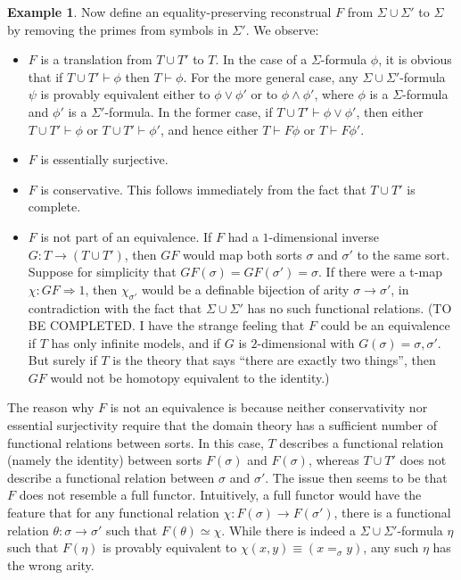 \documentclass[12pt]{article}
\theoremstyle{definition}
\newtheorem{example}[prop]{Example}
\theoremstyle{remark}
\newcommand{\3}{\mathcal}
\begin{document}
\begin{example}
  Now define an equality-preserving reconstrual $F$ from
  $\Sigma\cup \Sigma '$ to $\Sigma$ by removing the primes from
  symbols in $\Sigma '$. We observe:
  \begin{itemize}
  \item $F$ is a translation from $T\cup T'$ to $T$. In the case of a
    $\Sigma$-formula $\phi$, it is obvious that if
    $T\cup T'\vdash\phi$ then $T\vdash\phi$. For the more general
    case, any $\Sigma\cup \Sigma '$-formula $\psi$ is provably
    equivalent either to $\phi \vee \phi '$ or to $\phi \wedge\phi '$,
    where $\phi$ is a $\Sigma$-formula and $\phi '$ is a
    $\Sigma '$-formula. In the former case, if
    $T\cup T'\vdash \phi \vee \phi '$, then either
    $T\cup T'\vdash \phi$ or $T\cup T'\vdash \phi '$, and hence either
    $T\vdash F\phi$ or $T\vdash F\phi '$.
  \item $F$ is essentially surjective.
  \item $F$ is conservative. This follows immediately from the fact
    that $T\cup T'$ is complete.
  \item $F$ is not part of an equivalence. If $F$ had a
    $1$-dimensional inverse $G:T\to (T\cup T')$, then $GF$ would map
    both sorts $\sigma$ and $\sigma '$ to the same sort. Suppose for
    simplicity that $GF(\sigma )=GF(\sigma ')=\sigma$. If there were a
    t-map $\chi :GF\Rightarrow 1$, then $\chi _{\sigma '}$ would be a
    definable bijection of arity $\sigma\to\sigma '$, in contradiction
    with the fact that $\Sigma \cup \Sigma '$ has no such functional
    relations. (TO BE COMPLETED. I have the strange feeling that $F$
    could be an equivalence if $T$ has only infinite models, and if
    $G$ is $2$-dimensional with $G(\sigma )=\sigma ,\sigma '$. But
    surely if $T$ is the theory that says ``there are exactly two
    things'', then $GF$ would not be homotopy equivalent to the
    identity.)
  \end{itemize}
  The reason why $F$ is not an equivalence is because neither
  conservativity nor essential surjectivity require that the domain
  theory has a sufficient number of functional relations between
  sorts. In this case, $T$ describes a functional relation (namely the
  identity) between sorts $F(\sigma )$ and $F(\sigma )$, whereas
  $T\cup T'$ does not describe a functional relation between $\sigma$
  and $\sigma '$.  The issue then seems to be that $F$ does not
  resemble a full functor. Intuitively, a full functor would have the
  feature that for any functional relation
  $\chi :F(\sigma )\to F(\sigma ')$, there is a functional relation
  $\theta :\sigma \to \sigma '$ such that $F(\theta )\simeq
  \chi$. While there is indeed a $\Sigma\cup \Sigma '$-formula $\eta$
  such that $F(\eta )$ is provably equivalent to
  $\chi (x,y)\equiv (x=_\sigma y)$, any such $\eta$ has the wrong
  arity.


\end{example}
\end{document}
